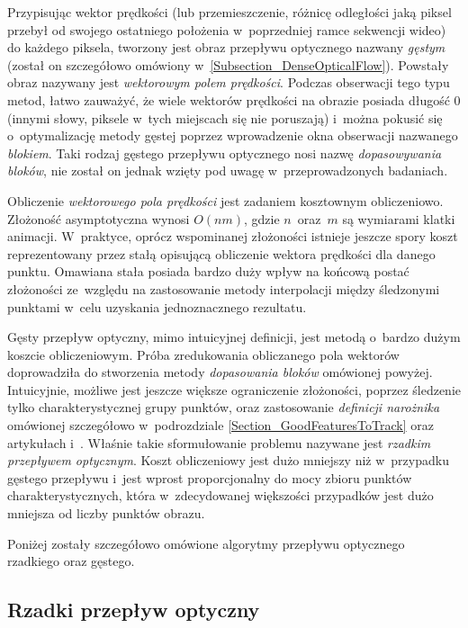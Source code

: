       Przypisując wektor prędkości (lub przemieszczenie, różnicę odległości jaką piksel przebył od swojego ostatniego położenia w~poprzedniej ramce sekwencji wideo) do każdego piksela, tworzony jest obraz przepływu optycznego nazwany \textit{gęstym} (został on szczegółowo omówiony w~\ref{Subsection_DenseOpticalFlow}). Powstały obraz nazywany jest \textit{wektorowym polem prędkości}. Podczas obserwacji tego typu metod, łatwo zauważyć, że wiele wektorów prędkości na obrazie posiada długość $0$ (innymi słowy, piksele w~tych miejscach się nie poruszają) i~można pokusić się o~optymalizację metody gęstej poprzez wprowadzenie okna obserwacji nazwanego \textit{blokiem}. Taki rodzaj gęstego przepływu optycznego nosi nazwę \textit{dopasowywania bloków}, nie został on jednak wzięty pod uwagę w~przeprowadzonych badaniach.

      Obliczenie \textit{wektorowego pola prędkości} jest zadaniem kosztownym obliczeniowo. Złożoność asymptotyczna wynosi $O(nm)$, gdzie $n$~oraz~$m$ są wymiarami klatki animacji. W~praktyce, oprócz wspominanej złożoności istnieje jeszcze spory koszt reprezentowany przez stałą opisującą obliczenie wektora prędkości dla danego punktu. Omawiana stała posiada bardzo duży wpływ na końcową postać złożoności ze~względu na zastosowanie metody interpolacji między śledzonymi punktami w~celu uzyskania jednoznacznego rezultatu.

      Gęsty przepływ optyczny, mimo intuicyjnej definicji, jest metodą o~bardzo dużym koszcie obliczeniowym. Próba zredukowania obliczanego pola wektorów doprowadziła do stworzenia metody \textit{dopasowania bloków} omówionej powyżej. Intuicyjnie, możliwe jest jeszcze większe ograniczenie złożoności, poprzez śledzenie tylko charakterystycznej grupy punktów, oraz zastosowanie \textit{definicji narożnika} omówionej szczegółowo w~podrozdziale \ref{Section_GoodFeaturesToTrack} oraz artykułach \cite{LucasKanadeTracker81} i~\cite{GoodFeaturesToTrack94}. Właśnie takie sformułowanie problemu nazywane jest \textit{rzadkim przepływem optycznym}. Koszt obliczeniowy jest dużo mniejszy niż w~przypadku gęstego przepływu i~jest wprost proporcjonalny do mocy zbioru punktów charakterystycznych, która w~zdecydowanej większości przypadków jest dużo mniejsza od liczby punktów obrazu.

      Poniżej zostały szczegółowo omówione algorytmy przepływu optycznego rzadkiego oraz gęstego.

    \subsection{Rzadki przepływ optyczny}

